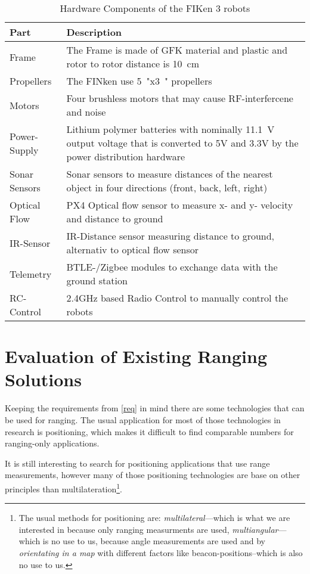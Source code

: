 \begin{table}[H]
	\begin{tabularx}{\columnwidth}{l | X}
	Part & Description \\ \hline
	Frame & The Frame is made of GFK material and plastic and rotor to rotor distance is \SI{10}{\centi\metre} \\
	Propellers & The FINken use \SI{5}{"}x\SI{3}{"} propellers \\
	Motors & Four brushless motors that may cause RF-interfercene and noise \\
	Power-Supply & Lithium polymer batteries with nominally \SI{11.1}{\volt} output voltage that is converted to 5V and 3.3V by the power distribution hardware \\
	Sonar Sensors & Sonar sensors to measure distances of the nearest object in four directions (front, back, left, right) \\
	Optical Flow & PX4 Optical flow sensor to measure x- and y- velocity and distance to ground \\
	IR-Sensor & IR-Distance sensor measuring distance to ground, alternativ to optical flow sensor \\
	Telemetry & BTLE-/Zigbee modules to exchange data with the ground station \\
	RC-Control &  2.4GHz based Radio Control to manually control the robots \\
	\end{tabularx}
	\caption{Hardware Components of the FIKen 3 robots}
\end{table}

\section{Evaluation of Existing Ranging Solutions}

Keeping the requirements from \autoref{req} in mind  there are some technologies that can be used for ranging.
The usual application for most of those technologies in research is positioning, which makes it difficult to find comparable numbers for ranging-only applications.



It is still interesting to search for positioning applications that use range measurements, however many of those positioning technologies are base on other principles than multilateration\footnote{The usual methods for positioning are: \emph{multilateral}—which is what we are interested in because only ranging measurments are used, \emph{multiangular}—which is no use  to us, because angle measurements are used and by \emph{orientating in a map} with different factors like beacon-positions–which is also no use to us.}.
\cite{_multilateration_2015}

